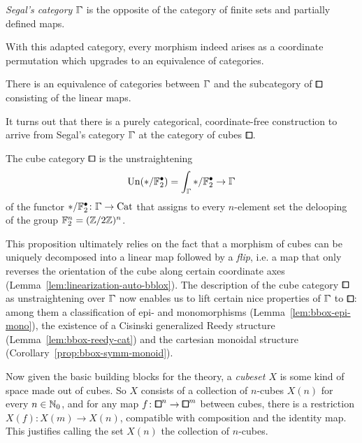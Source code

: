 \begin{definition*}
\emph{Segal's category $\bbGamma$} is the opposite of the category of finite sets
and partially defined maps.
\end{definition*}

With this adapted category, every morphism indeed arises as a coordinate permutation
which upgrades to an equivalence of categories.

\begin{proposition*}
There is an equivalence of categories between $\bbGamma$ and the subcategory of $\bbox$
consisting of the linear maps.
\end{proposition*}

It turns out that there is a purely categorical, coordinate-free construction to arrive from Segal's category $\bbGamma$
at the category of cubes $\bbox$.

\begin{proposition*}
The cube category $\bbox$ is the unstraightening
\[
    \mathrm{Un}(\ast/\F_2^\bullet)=\int_{\bbGamma} \ast/\F_2^\bullet\to\bbGamma
\]
of the functor $\ast/\F_2^\bullet\colon\bbGamma\to\Cat$ that assigns to every $n$-element set
the delooping of the group $\mathbb{F}_2^n = (\mathbb{Z}/2\mathbb{Z})^n$.
\end{proposition*}

This proposition ultimately relies on the fact that a morphism of cubes
can be uniquely decomposed into a linear map followed by a \emph{flip},
i.e. a map that only reverses the orientation of the cube along certain coordinate axes
(Lemma~\ref{lem:linearization-auto-bblox}).
The description of the cube category $\bbox$ as unstraightening over $\bbGamma$
now enables us to lift certain nice properties of $\bbGamma$ to $\bbox$:
among them a classification of epi- and monomorphisms (Lemma~\ref{lem:bbox-epi-mono}),
the existence of a Cisinski generalized Reedy structure (Lemma~\ref{lem:bbox-reedy-cat})
and the cartesian monoidal structure (Corollary~\ref{prop:bbox-symm-monoid}).

Now given the basic building blocks for the theory, a \emph{cubeset $X$} is some kind of space made out of cubes.
So $X$ consists of a collection of $n$-cubes $X(n)$ for every $n\in{\mathbb{N}}_0$,
and for any map $f\colon{\bbox}^n\to{\bbox}^m$ between cubes,
there is a restriction $X(f)\colon X(m)\to X(n)$, compatible with composition and the identity map.
This justifies calling the set $X(n)$ the collection of $n$-cubes.


